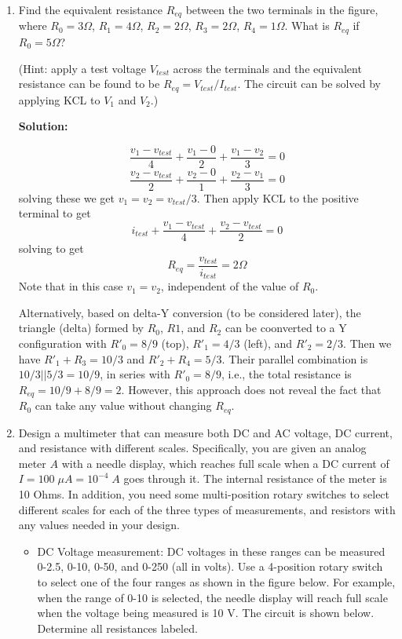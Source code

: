 \begin{enumerate}

{\bf Solution:}
 before S is closed, $R=(3+2)//(6+2)=5//8=40/13 \Omega$

 after S is closed, $R=2//2+3//6=1+2=3 \Omega$

\item Find the equivalent resistance $R_{eq}$ between the two terminals
in the figure, where $R_0=3\Omega$, $R_1=4\Omega$, $R_2=2\Omega$, $R_3=2\Omega$, 
$R_4=1\Omega$. What is $R_{eq}$ if $R_0=5\Omega$?

(Hint: apply a test voltage $V_{test}$ across the terminals and the 
equivalent resistance can be found to be $R_{eq}=V_{test}/I_{test}$.
The circuit can be solved by applying KCL to $V_1$ and $V_2$.)


{\bf Solution:}

\[ \frac{v_1-v_{test}}{4}+\frac{v_1-0}{2}+\frac{v_1-v_2}{3}=0 \]
\[ \frac{v_2-v_{test}}{2}+\frac{v_2-0}{1}+\frac{v_2-v_1}{3}=0 \]
solving these we get $v_1=v_2=v_{test}/3$. Then apply KCL to the
positive terminal to get
\[ i_{test}+\frac{v_1-v_{test}}{4}+\frac{v_2-v_{test}}{2}=0 \]
solving to get
\[R_{eq}=\frac{v_{test}}{i_{test}}=2 \Omega \]
Note that in this case $v_1=v_2$, independent of the value of $R_0$.

Alternatively, based on delta-Y conversion (to be considered later), the 
triangle (delta) formed by $R_0$, $R1$, and $R_2$ can be coonverted to a Y 
configuration with $R'_0=8/9$ (top), $R'_1=4/3$ (left), and $R'_2=2/3$. Then
we have $R'_1+R_3=10/3$ and $R'_2+R_4=5/3$. Their parallel combination is 
$10/3 || 5/3=10/9$, in series with $R'_0=8/9$, i.e., the total resistance
is $R_{eq}=10/9+8/9=2$. However, this approach does not reveal the fact that 
$R_0$ can take any value without changing $R_{eq}$.

\item Design a multimeter that can measure both DC and AC voltage, DC current,
  and resistance with different scales. Specifically, you are given an analog 
  meter $A$ with a needle display, which reaches full scale when a DC current 
  of $I=100\;\mu A=10^{-4}\;A$ goes through it. The internal resistance of the
  meter is 10 Ohms. In addition, you need some multi-position rotary switches 
  to select different scales for each of the three types of measurements, and 
  resistors with any values needed in your design.

  \begin{itemize}
    \item DC Voltage measurement: DC voltages in these ranges can be measured
      0-2.5, 0-10, 0-50, and 0-250 (all in volts). Use a 4-position rotary switch
      to select one of the four ranges as shown in the figure below. For example, 
      when the range of 0-10 is selected, the needle display will reach full scale 
      when the voltage being measured is 10 V. The circuit is shown below. Determine 
      all resistances labeled.


\end{itemize}
\end{enumerate}
